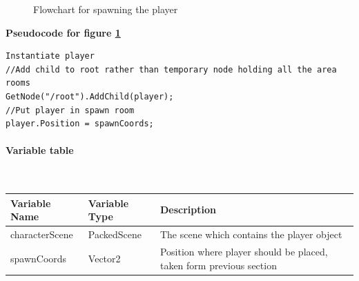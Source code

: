 \documentclass{article}
\newcommand{\myparagraph}[1]{\paragraph{#1}\mbox{}\\} %
\newcommand{\smallBr}{\vspace{1.5mm}}
\begin{document}
\begin{figure}[h]
    \centering
    \caption{Flowchart for spawning the player}
    \label{fig:spawn player}
\end{figure}

\textbf{Pseudocode for figure \ref{fig:spawn player}}
\begin{lstlisting}
Instantiate player
//Add child to root rather than temporary node holding all the area rooms
GetNode("/root").AddChild(player);
//Put player in spawn room
player.Position = spawnCoords;
\end{lstlisting}

\myparagraph{Variable table}
\smallBr
\begin{tabular}{l|l|l}
Variable Name  & Variable Type & Description                                                         \\ \hline
characterScene & PackedScene   & The scene which contains the player object                          \\
spawnCoords    & Vector2       & Position where player should be placed, taken form previous section
\end{tabular}

\pagebreak
\end{document}
